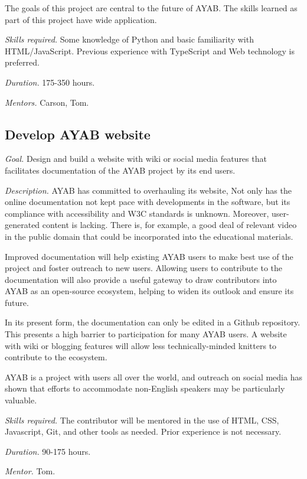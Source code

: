 \documentclass{article}
\begin{document}
The goals of this project are central to the future of AYAB. The skills learned as part of this project have wide application.

\textit{Skills required.} Some knowledge of Python and basic familiarity with HTML/JavaScript. Previous experience with TypeScript and Web technology is preferred.

\textit{Duration.} 175-350 hours. 

\textit{Mentors.} Carson, Tom.


\subsection{Develop AYAB website} 

\textit{Goal.} Design and build a website with wiki or social media features that facilitates documentation of the AYAB project by its end users. 

\textit{Description.} AYAB has committed to overhauling its website, Not only has the online documentation not kept pace with developments in the software, but its compliance with accessibility and W3C standards is unknown. Moreover, user-generated content is lacking. There is, for example, a good deal of relevant video in the public domain that could be incorporated into the educational materials.

Improved documentation will help existing AYAB users to make best use of the project and foster outreach to new users. Allowing users to contribute to the documentation will also provide a useful gateway to draw contributors into AYAB as an open-source ecosystem, helping to widen its outlook and ensure its future.

In its present form, the documentation can only be edited in a Github repository. This presents a high barrier to participation for many AYAB users. A website with wiki or blogging features will allow less technically-minded knitters to contribute to the ecosystem. 

AYAB is a project with users all over the world, and outreach on social media has shown that efforts to accommodate non-English speakers may be particularly valuable.

\textit{Skills required.} The contributor will be mentored in the use of HTML, CSS, Javascript, Git, and other tools as needed. Prior experience is not necessary.

\textit{Duration.} 90-175 hours. 

\textit{Mentor.} Tom.
\end{document}
